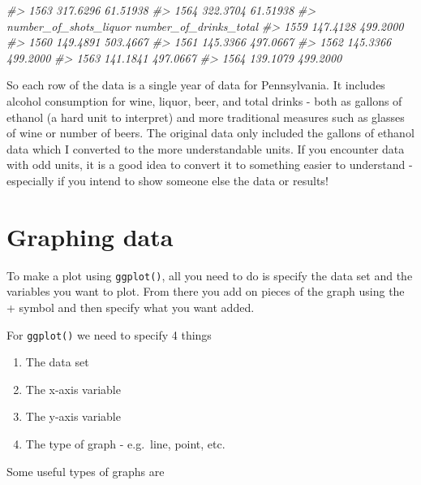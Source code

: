 \documentclass[
]{krantz}
\makeatletter
\newenvironment{Shaded}{\begin{snugshade}}{\end{snugshade}}
\newcommand{\CommentTok}[1]{\textcolor[rgb]{0.37,0.37,0.37}{\textit{#1}}}
\providecommand{\tightlist}{%
  \setlength{\itemsep}{0pt}\setlength{\parskip}{0pt}}
\newenvironment{kframe}{%
\medskip{}
\setlength{\fboxsep}{.8em}
 \def\at@end@of@kframe{}%
 \ifinner\ifhmode%
  \def\at@end@of@kframe{\end{minipage}}%
  \begin{minipage}{\columnwidth}%
 \fi\fi%
 \def\FrameCommand##1{\hskip\@totalleftmargin \hskip-\fboxsep
 \colorbox{shadecolor}{##1}\hskip-\fboxsep
     \hskip-\linewidth \hskip-\@totalleftmargin \hskip\columnwidth}%
 \MakeFramed {\advance\hsize-\width
   \@totalleftmargin\z@ \linewidth\hsize
   \@setminipage}}%
 {\par\unskip\endMakeFramed%
 \at@end@of@kframe}
\renewenvironment{Shaded}{\begin{kframe}}{\end{kframe}}
\makeatother
\begin{document}
\begin{Shaded}
\begin{Highlighting}[]
\CommentTok{\#\textgreater{} 1563        317.6296               61.51938}
\CommentTok{\#\textgreater{} 1564        322.3704               61.51938}
\CommentTok{\#\textgreater{}      number\_of\_shots\_liquor number\_of\_drinks\_total}
\CommentTok{\#\textgreater{} 1559               147.4128               499.2000}
\CommentTok{\#\textgreater{} 1560               149.4891               503.4667}
\CommentTok{\#\textgreater{} 1561               145.3366               497.0667}
\CommentTok{\#\textgreater{} 1562               145.3366               499.2000}
\CommentTok{\#\textgreater{} 1563               141.1841               497.0667}
\CommentTok{\#\textgreater{} 1564               139.1079               499.2000}
\end{Highlighting}
\end{Shaded}

So each row of the data is a single year of data for Pennsylvania. It includes alcohol consumption for wine, liquor, beer, and total drinks - both as gallons of ethanol (a hard unit to interpret) and more traditional measures such as glasses of wine or number of beers. The original data only included the gallons of ethanol data which I converted to the more understandable units. If you encounter data with odd units, it is a good idea to convert it to something easier to understand - especially if you intend to show someone else the data or results!

\hypertarget{graphing-data}{%
\section{Graphing data}\label{graphing-data}}

To make a plot using \texttt{ggplot()}, all you need to do is specify the data set and the variables you want to plot. From there you add on pieces of the graph using the + symbol and then specify what you want added.

For \texttt{ggplot()} we need to specify 4 things

\begin{enumerate}
\def\labelenumi{\arabic{enumi}.}
\tightlist
\item
  The data set
\item
  The x-axis variable
\item
  The y-axis variable
\item
  The type of graph - e.g.~line, point, etc.
\end{enumerate}

Some useful types of graphs are
\end{document}
